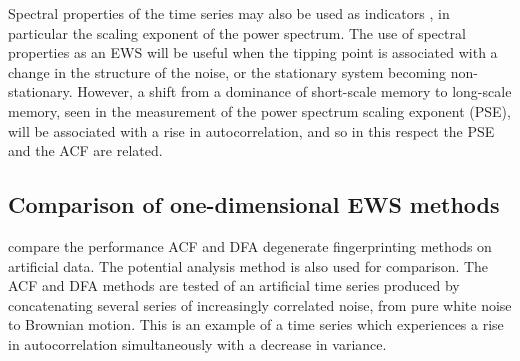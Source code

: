 \documentclass[11pt,a4paper,reqno]{article}
\numberwithin{equation}{section}
\begin{document}
Spectral properties of the time series may also be used as indicators \citep{kleinen2003}, in particular the scaling exponent of the power spectrum.  The use of spectral properties as an EWS will be useful when the tipping point is associated with a change in the structure of the noise, or the stationary system becoming non-stationary. However, a shift from a dominance of short-scale memory to long-scale memory, seen in the measurement of the power spectrum scaling exponent (PSE), will be associated with a rise in autocorrelation, and so in this respect the PSE and the ACF are related. 

\subsection{Comparison of one-dimensional EWS methods}
\cite{livina2012} compare the performance ACF and DFA degenerate fingerprinting methods on artificial  data. The potential analysis method \citep{livina2011} is also used for comparison. The ACF and DFA methods are tested of an artificial time series produced by concatenating several series of increasingly correlated noise, from pure white noise to Brownian motion. This is an example of a time series which experiences a rise in autocorrelation simultaneously with a decrease in variance. 
\end{document}
